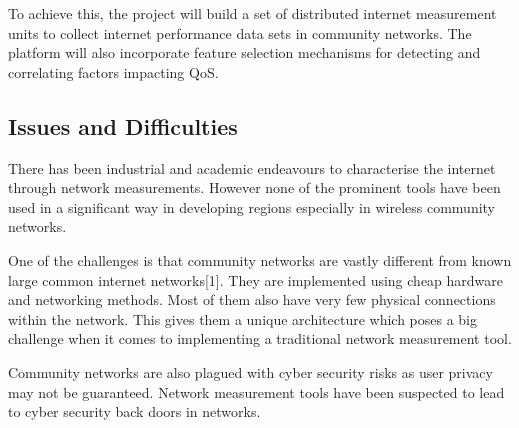 To achieve this, the project will build a set of distributed internet measurement units to collect internet performance data sets in community networks. The platform will also incorporate feature selection mechanisms for detecting and correlating factors impacting QoS.

\subsection{Issues and Difficulties}
There has been industrial and academic endeavours to characterise the internet through network measurements. However none of the prominent tools have been used in a significant way in developing regions especially in wireless community networks.

One of the challenges is that community networks are vastly different from known large common internet networks[1]. They are implemented using cheap hardware and networking methods. Most of them also have very few physical connections within the network. This gives them a unique architecture which poses a big challenge when it comes to implementing a traditional network measurement tool.

Community networks are also plagued with cyber security risks as user privacy may not be guaranteed. Network measurement tools have been suspected to lead to cyber security back doors in networks. 


